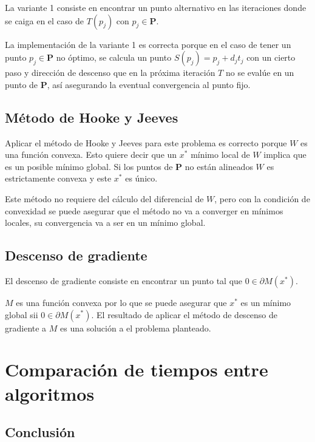 \documentclass[10pt]{article}
\begin{document}
La variante 1 consiste en encontrar un punto alternativo en las iteraciones donde se caiga en el caso de $T(p_j)$ con $p_j \in \mathbf{P}$.

 La implementación de la variante 1 es correcta porque en el caso de tener un punto $p_j \in \mathbf{P}$ no óptimo, se calcula un punto $S(p_j) = p_j + d_j t_j$ con un cierto paso y dirección de descenso que en la próxima iteración $T$ no se evalúe en un punto de $\mathbf{P}$, así asegurando la eventual convergencia al punto fijo.
\subsection{Método de Hooke y Jeeves}

Aplicar el método de Hooke y Jeeves para este problema es correcto porque $W$ es una función convexa. Esto quiere decir que un $x^*$ mínimo local de $W$ implica que es un posible mínimo global. Si los puntos de $\mathbf{P}$ no están alineados $W$ es estrictamente convexa y este $x^*$ es único.

Este método no requiere del cálculo del diferencial de $W$, pero con la condición de convexidad se puede asegurar que el método no va a converger en mínimos locales, su convergencia va a ser en un mínimo global.
	
\subsection{Descenso de gradiente}

El descenso de gradiente consiste en encontrar un punto tal que $0 \in \partial M(x^*)$. 

$M$ es una función convexa por lo que se puede asegurar que $x^*$ es un mínimo global sii $0 \in \partial M(x^*)$. El resultado de aplicar el método de descenso de gradiente a $M$ es una solución a el problema planteado.

\section{Comparación de tiempos entre algoritmos}


\subsection{Conclusión}
\end{document}
